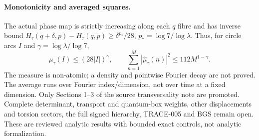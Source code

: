 \paragraph{Monotonicity and averaged squares.}
The actual phase map is strictly increasing along each $q$ fibre and has
inverse bound $H_\tau(q+\delta,p)-H_\tau(q,p)\ge\delta^{p_*}/28$,
$p_*=\log7/\log\lambda$. Thus, for circle arcs $I$ and
$\gamma=\log\lambda/\log7$,
\[
 \mu_\tau(I)\le(28|I|)^\gamma,\qquad
 \sum_{n=1}^M|\widehat\mu_\tau(n)|^2\le112M^{1-\gamma}.
\]
The measure is non-atomic; a density and pointwise Fourier decay are not
proved. The average runs over Fourier index/dimension, not over time at a
fixed dimension. Only Sections 1--3 of the source transversality note are
promoted. Complete determinant, transport and quantum-box weights, other
displacements and torsion sectors, the full signed hierarchy, TRACE-005 and
BGS remain open. These are reviewed analytic results with bounded exact
controls, not analytic formalization.
